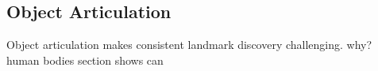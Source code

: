 	\subsection{Object Articulation}\label{sec:articulation}
		Object articulation makes consistent landmark discovery challenging. why?
		human bodies section shows can


